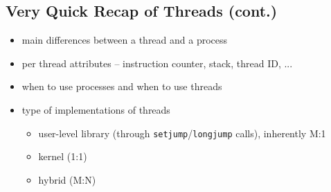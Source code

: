 
\subsection{Very Quick Recap of Threads (cont.)}

\begin{itemize}
\item main differences between a thread and a process
\item per thread attributes -- instruction counter, stack, thread ID, ...
\item when to use processes and when to use threads
\item type of implementations of threads
	\begin{itemize}
	\item user-level library (through \texttt{setjump}/\texttt{longjump}
	calls), inherently M:1
	\item kernel (1:1)
	\item hybrid (M:N)
	\end{itemize}
\end{itemize}

